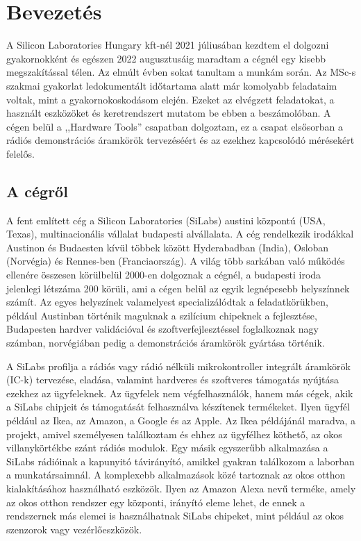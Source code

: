     \section{Bevezetés}
    A Silicon Laboratories Hungary kft-nél 2021 júliusában kezdtem el dolgozni gyakornokként és egészen 2022 augusztusáig maradtam a cégnél egy kisebb megszakítással télen. Az elmúlt évben sokat tanultam a munkám során. Az MSc-s szakmai gyakorlat ledokumentált időtartama alatt már komolyabb feladataim voltak, mint a gyakornokoskodásom elején. Ezeket az elvégzett feladatokat, a használt eszközöket és keretrendszert mutatom be ebben a beszámolóban. A cégen belül a ,,Hardware Tools'' csapatban dolgoztam, ez a csapat elsősorban a rádiós demonstrációs áramkörök tervezéséért és az ezekhez kapcsolódó mérésekért felelős.
    \subsection{A cégről}
        A fent említett cég a Silicon Laboratories (SiLabs) austini központú (USA, Texas), multinacionális vállalat budapesti alvállalata. A cég rendelkezik irodákkal Austinon és Budaesten kívül többek között Hyderabadban (India), Osloban (Norvégia) és Rennes-ben (Franciaország). A világ több sarkában való működés ellenére összesen körülbelül 2000-en dolgoznak a cégnél, a budapesti iroda jelenlegi létszáma 200 körüli, ami a cégen belül az egyik legnépesebb helyszínnek számít. Az egyes helyszínek valamelyest specializálódtak a feladatkörükben, például Austinban történik maguknak a szilícium chipeknek a fejlesztése, Budapesten hardver validációval és szoftverfejlesztéssel foglalkoznak nagy számban, norvégiában pedig a demonstrációs áramkörök gyártása történik.
        \par
        A SiLabs profilja a rádiós vagy rádió nélküli mikrokontroller integrált áramkörök (IC-k) tervezése, eladása, valamint hardveres és szoftveres támogatás nyújtása ezekhez az ügyfeleknek. Az ügyfelek nem végfelhasználók, hanem más cégek, akik a SiLabs chipjeit és támogatását felhasználva készítenek termékeket. Ilyen ügyfél például az Ikea, az Amazon, a Google és az Apple. Az Ikea példájánál maradva, a projekt, amivel személyesen találkoztam és ehhez az ügyfélhez köthető, az okos villanykörtékbe szánt rádiós modulok. Egy másik egyszerűbb alkalmazása a SiLabs rádióinak a kapunyitó távirányító, amikkel gyakran találkozom a laborban a munkatársaimnál. A komplexebb alkalmazások közé tartoznak az okos otthon kialakításához használható eszközök. Ilyen az Amazon Alexa nevű terméke, amely az okos otthon rendszer egy központi, irányító eleme lehet, de ennek a rendszernek más elemei is használhatnak SiLabs chipeket, mint például az okos szenzorok vagy vezérlőeszközök.
